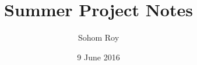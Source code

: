 \documentclass[a4,10pt,twoside]{report}
\begin{document}
	\huge{\title{Summer Project Notes}}
	\date{9 June 2016}
	\author{Sohom Roy}
	\maketitle
\end{document}
